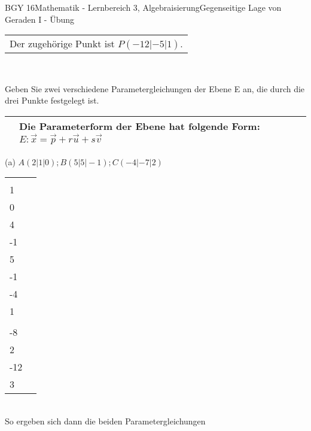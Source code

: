 \documentclass[oneside,openany,headings=optiontotoc,11pt,numbers=noenddot]{scrreprt}
\begin{document}
\begin{worksheet}{BGY 16}{Mathematik - Lernbereich 3, Algebraisierung}{Gegenseitige Lage von Geraden I - Übung}
\begin{framed}
\begin{tabularx}{\textwidth}{lX}
				\multicolumn{2}{l}{Der zugehörige Punkt ist \(P(-12|-5|1)\).}\\
			\end{tabularx}
			\par\noindent
			\hdashrule[0.5ex][x]{\textwidth}{0.2mm}{8mm 2pt}\\
			\par\noindent
			Geben Sie zwei verschiedene Parametergleichungen der Ebene E an, die durch die drei Punkte festgelegt ist.\\
			\begin{tabularx}{\textwidth}{lX}
				\hline
				& Die Parameterform der Ebene hat folgende Form: \(E: \vec{x} = \vec{p} + r\vec{u} + s\vec{v}\)\\
				\hline
			\end{tabularx}	
			(a) \(A(2|1|0); B(5|5|-1); C(-4|-7|2)\)\\
			\begin{tabularx}{\textwidth}{X|X}
				\(\vec{p} = \vec{0A} = \left(\begin{matrix}2\\1\\0\end{matrix}\right), \vec{u_1} = \vec{AB} = \left(\begin{matrix}3\\4\\-1\end{matrix}\right)\) & \(\vec{q} = \vec{0B} =  \left(\begin{matrix}5\\5\\-1\end{matrix}\right), \vec{u_2} = \vec{BA} = \left(\begin{matrix}-3\\-4\\1\end{matrix}\right)\)\\
				\(\vec{v_1} = \vec{AC} = \left(\begin{matrix}-6\\-8\\2\end{matrix}\right)\) & \(\vec{v_2} = \vec{BC} = \left(\begin{matrix}-9\\-12\\3\end{matrix}\right)\)\\
			\end{tabularx}\\
			So ergeben sich dann die beiden Parametergleichungen\\

\end{framed}
\end{worksheet}
\end{document}
